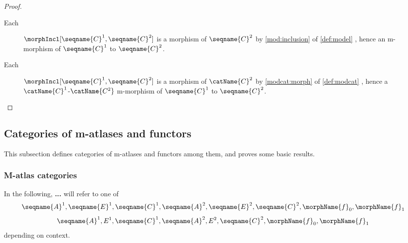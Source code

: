 \documentclass{article}
\begin{document}
\begin{lemma}
\begin{proof}
\begin{description}
\item%
  [
    Each
    \ensuremath
      {
        \Top{\seqname{C}^i} \objin \seqname{C}^i
      }:
  ]
$\morphIncl[{\seqname{C}^1},{\seqname{C}^2}]$ is a morphism of
$\seqname{C}^2$ by \cref{mod:inclusion} of
{
  \showlabelsinline
  \cref{def:model}
},
hence an m-morphism of $\seqname{C}^1$ to $\seqname{C}^2$.

\item%
  [
    Each
    \ensuremath
      {
        \seqname{C}^i \objin \catName{C}^2
      }:
  ]
$\morphIncl[{\seqname{C}^1},{\seqname{C}^2}]$ is a morphism of
$\catName{C}^2$ by \cref{modcat:morph} of
{
  \showlabelsinline
  \cref{def:modcat}
},
hence a $\catName{C}^1$-$\catName{C^2}$ m-morphism of $\seqname{C}^1$ to
$\seqname{C}^2$.
\end{description}
\end{proof}
\end{lemma}

\subsection{Categories of m-atlases and functors}
\label{sub:M-cat}
This subsection defines categories of m-atlases and functors among them,
and proves some basic results.

\subsubsection{M-atlas categories}
In the following, \textbf{...} will refer to one of
\begin{equation*}
  \seqname{A}^1, \seqname{E}^1, \seqname{C}^1,
  \seqname{A}^2, \seqname{E}^2, \seqname{C}^2,
  \morphName{f}_0, \morphName{f}_1
\end{equation*}
\begin{equation*}
  \seqname{A}^1, E^1, \seqname{C}^1,
  \seqname{A}^2, E^2, \seqname{C}^2,
  \morphName{f}_0, \morphName{f}_1
\end{equation*}
depending on context.
\end{document}
